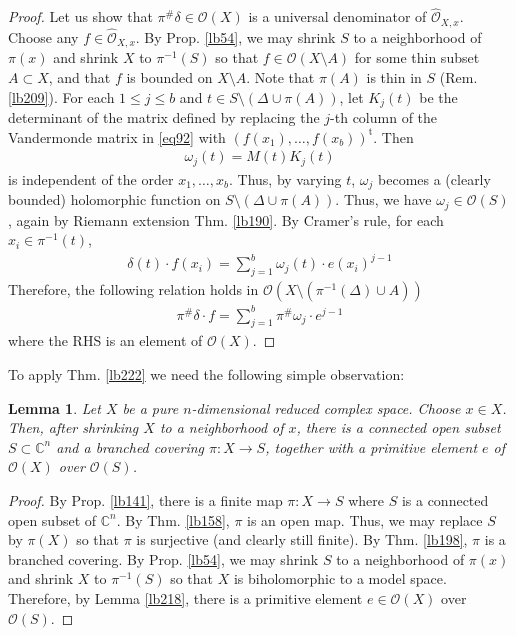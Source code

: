 \documentclass[12pt,b5paper,notitlepage]{report}
\theoremstyle{definition}
\theoremstyle{plain}
\newtheorem{lm}[df]{Lemma}
\newcommand{\tr}{\mathrm{t}} %
\newcommand{\scr}{\mathscr}
\newcommand{\Cbb}{\mathbb C}
\newcommand{\Owht}{\widehat{\scr O}}
\numberwithin{equation}{section}
\begin{document}
\begin{proof}
Let us show that $\pi^\#\delta\in\scr O(X)$ is a universal denominator of $\Owht_{X,x}$. Choose any $f\in\Owht_{X,x}$. By Prop. \ref{lb54}, we may shrink $S$ to a neighborhood of $\pi(x)$ and shrink $X$ to $\pi^{-1}(S)$ so that $f\in \scr O(X\setminus A)$ for some thin subset $A\subset X$, and that $f$ is bounded on $X\setminus A$. Note that $\pi(A)$ is thin in $S$ (Rem. \ref{lb209}). For each $1\leq j\leq b$ and $t\in S\setminus(\Delta\cup \pi(A))$, let $K_j(t)$ be the determinant of the matrix defined by replacing the $j$-th column of the Vandermonde matrix in \eqref{eq92} with $(f(x_1),\dots,f(x_b))^\tr$. Then
\begin{align}
\omega_j(t)=M(t)K_j(t) \label{eq95}
\end{align}
is independent of the order $x_1,\dots,x_b$. Thus, by varying $t$, $\omega_j$ becomes a (clearly bounded) holomorphic function on $S\setminus(\Delta\cup\pi(A))$. Thus, we have $\omega_j\in\scr O(S)$, again by Riemann extension Thm. \ref{lb190}. By Cramer's rule, for each $x_i\in\pi^{-1}(t)$,
\begin{align*} 
\delta(t)\cdot f(x_i)=\sum_{j=1}^{b}\omega_j(t)\cdot e(x_i)^{j-1}
\end{align*}
Therefore, the following relation holds in $\scr O(X\setminus(\pi^{-1}(\Delta)\cup A))$
\begin{align}
\pi^\#\delta\cdot f=\sum_{j=1}^b\pi^\#\omega_j\cdot e^{j-1} \label{eq93}
\end{align}
where the RHS is an element of $\scr O(X)$.
\end{proof}


To apply Thm. \ref{lb222} we need the following simple observation:

\begin{lm}\label{lb364}
Let $X$ be a pure $n$-dimensional reduced complex space. Choose $x\in X$. Then, after shrinking $X$ to a neighborhood of $x$, there is a connected open subset $S\subset\Cbb^n$ and a branched covering $\pi:X\rightarrow S$, together with a primitive element $e$ of $\scr O(X)$ over $\scr O(S)$.
\end{lm}

\begin{proof}
By Prop. \ref{lb141}, there is a finite map $\pi:X\rightarrow S$ where $S$ is a connected open subset of $\Cbb^n$. By Thm. \ref{lb158}, $\pi$ is an open map. Thus, we may replace $S$ by $\pi(X)$ so that $\pi$ is surjective (and clearly still finite). By Thm. \ref{lb198}, $\pi$ is a branched covering. By Prop. \ref{lb54}, we may shrink $S$ to a neighborhood of $\pi(x)$ and shrink $X$ to $\pi^{-1}(S)$ so that $X$ is biholomorphic to a model space. Therefore, by Lemma \ref{lb218}, there is a primitive element $e\in\scr O(X)$ over $\scr O(S)$.
\end{proof}
\end{document}
